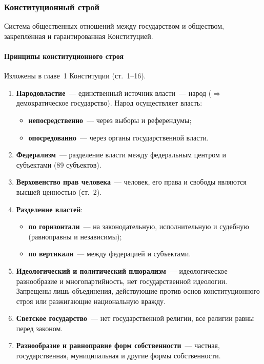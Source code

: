 \documentclass[12pt]{article}
\begin{document}
	\subsubsection{Конституционный строй}
	
	\begin{definition}
		Система общественных отношений между государством и обществом, закреплённая и гарантированная Конституцией.
	\end{definition}
	
	\paragraph{Принципы конституционного строя} Изложены в главе~1 Конституции (ст.~1--16).
	
	\begin{enumerate}
		\item \textbf{Народовластие}~--- единственный источник власти~--- народ ($\Rightarrow$ демократическое государство). Народ осуществляет власть:
		\begin{itemize}
			\item \textbf{непосредственно}~--- через выборы и референдумы;
			\item \textbf{опосредованно}~--- через органы государственной власти.
		\end{itemize}
		\item \textbf{Федерализм}~--- разделение власти между федеральным центром и субъектами (89 субъектов).
		\item \textbf{Верховенство прав человека}~--- человек, его права и свободы являются высшей ценностью (ст.~2).
		\item \textbf{Разделение властей}:
		\begin{itemize}
			\item \textbf{по горизонтали}~--- на законодательную, исполнительную и судебную (равноправны и независимы);
			\item \textbf{по вертикали}~--- между федерацией и субъектами.
		\end{itemize}
		\item \textbf{Идеологический и политический плюрализм}~--- идеологическое разнообразие и многопартийность, нет государственной идеологии. Запрещены лишь объединения, действующие против основ конституционного строя или разжигающие национальную вражду.
		\item \textbf{Светское государство}~--- нет государственной религии, все религии равны перед законом.
		\item \textbf{Разнообразие и равноправие форм собственности}~--- частная, государственная, муниципальная и другие формы собственности.
	\end{enumerate}
	
\end{document}
